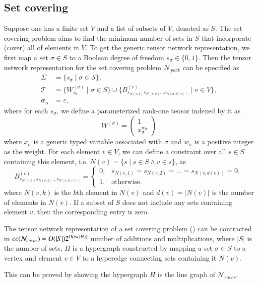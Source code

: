 \documentclass[review, onefignum, onetabnum]{siamart190516}
\begin{document}
\subsection{Set covering}
Suppose one has a finite set $V$ and a list of subsets of $V$, denoted as $S$.
The set covering problem aims to find the minimum number of sets in $S$ that incorporate (cover) all of elements in $V$.
To get the generic tensor network representation, we first map a set $\sigma \in S$ to a Boolean degree of freedom $s_\sigma\in\{0, 1\}$.
Then the tensor network representation for the set covering problem $\mathcal{N}_{pack}$ can be specified as
\begin{equation}\label{eq:covertensornetwork}
\begin{split}
    \Sigma &= \{s_\sigma \mid \sigma \in \mathcal{S}\},\\
    \mathcal{T} &= \{W^{(\sigma)}_{s_\sigma} \mid \sigma \in S\} \cup \{B^{(v)}_{s_{N(v, 1)}s_{N(v, 2)}\ldots s_{N(\sigma, d(v))}} \mid v \in V\},\\
    \boldsymbol{\sigma}_o &= \varepsilon,
\end{split}
\end{equation}
where for each $s_\sigma$, we define a parameterized rank-one tensor indexed by it as
\begin{equation}
W^{(\sigma)} = \left(\begin{matrix}
    1 \\
    x_\sigma^{w_\sigma}
    \end{matrix}\right)
\end{equation}
where $x_\sigma$ is a generic typed variable associated with $\sigma$ and $w_\sigma$ is a positive integer as the weight.
For each element $v \in V$, we can define a constraint over all $s \in S$ containing this element, i.e. $N(v) = \{s \mid s \in S \land v\in s\}$, as
\begin{equation}
B^{(v)}_{s_{N(v, 1)} s_{N(v, 2)} \ldots s_{N(v, d(v))}} = \begin{cases}
    0, & s_{N(v, 1)}=s_{N(v, 2)}=\ldots=s_{N(v, d(v))}=0,\\
    1, & \text{otherwise}.
\end{cases}
\end{equation}
where $N(v, k)$ is the $k$th element in $N(v)$ and $d(v) = |N(v)|$ is the number of elements in $N(v)$. 
If a subset of $S$ does not include any sets containing element $v$, then the corresponding entry is zero.

\begin{theorem}\label{thm:covercomplex}
    The tensor network representation of a set covering problem () can be contracted in $cc(\mathcal{N}_{cover}) = O(|S|)2^{O({\rm tw}(H))}$ number of additions and multiplications, where $|S|$ is the number of sets,
    $H$ is a hypergraph constructed by mapping a set $\sigma\in S$ to a vertex and element $v \in V$ to a hyperedge connecting sets containing it $N(v)$.
\end{theorem}
This can be proved by showing the hypergraph $H$ is the line graph of $\mathcal{N}_{cover}$.
\end{document}
